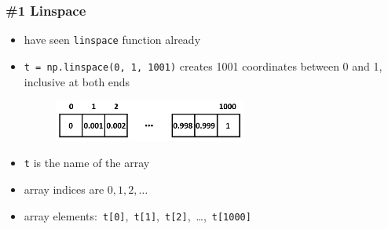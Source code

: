 \documentclass[english,14pt]{beamer}
\begin{document}
\begin{frame}[fragile]

\frametitle{\#1 Linspace}

\begin{itemize}
	\item have seen \texttt{linspace} function already
	\item \texttt{t = np.linspace(0, 1, 1001)} creates 1001 coordinates between 0 and 1, inclusive at both ends
	
	\begin{figure}[ht]
		\centering
		\includegraphics[width=0.6\textwidth]{figures/arrayElementsMilliseconds}
	\end{figure}

	\item \texttt{t} is the name of the array
	\item array indices are $0, 1, 2, \ldots$
	\item array elements:~\texttt{t[0]},~\texttt{t[1]},~\texttt{t[2]},~\ldots,~\texttt{t[1000]}
\end{itemize}

\end{frame}

\end{document}
